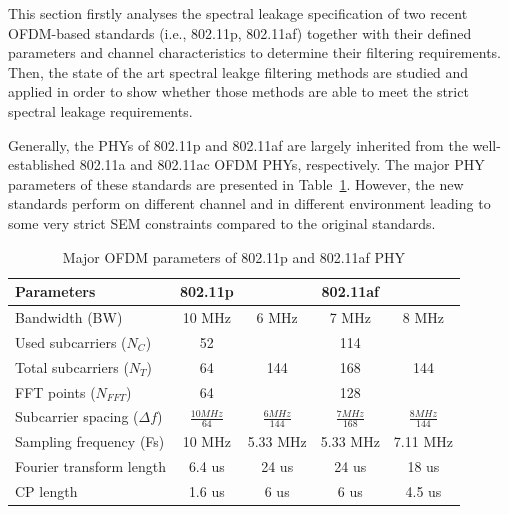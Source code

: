 This section firstly analyses the spectral leakage specification of  two recent OFDM-based standards (i.e., 802.11p, 802.11af) together with their defined parameters and channel characteristics to determine their filtering requirements. Then, the state of the art spectral leakge filtering methods are studied and applied in order to show whether those methods are able to meet the strict spectral leakage requirements.

Generally, the PHYs of 802.11p and 802.11af are largely inherited from the well-established 802.11a and 802.11ac OFDM PHYs, respectively.
The major PHY parameters of these standards are presented in Table~\ref{tab:Para}.
However, the new standards perform on different channel and in different environment leading to some very strict SEM constraints compared to the original standards.

\begin{table}[ht]
	\centering
	\caption{ Major OFDM parameters of 802.11p and 802.11af PHY}
	\renewcommand{\arraystretch}{1.2}
	\label{tab:Para}
	\begin{tabular}{l|c|c|c|c}%
		\hline \hline
		Parameters                      	 		& 802.11p & \multicolumn{3}{c}{802.11af} \\ \hline
		Bandwidth (BW)                  		& 10 MHz  & 6 MHz    & 7 MHz   & 8 MHz   \\ \hline
		Used subcarriers ($N_{C}$) 		& 52      & \multicolumn{3}{c}{114}      \\ \hline
		Total subcarriers ($N_{T}$)  		& 64      & 144      & 168     & 144     \\ \hline
		FFT points ($N_{FFT}$)      		& 64      & \multicolumn{3}{c}{128}      \\ \hline
		Subcarrier spacing ($\Delta f$)        	& $\frac{10 MHz}{64}$   & $\frac{6 MHz}{144}$    & $\frac{7 MHz}{168}$   & $\frac{8 MHz}{144}$   \\[1ex] \hline
		Sampling frequency (Fs)			& 10 MHz & 5.33 MHz & 5.33 MHz & 7.11 MHz  \\ \hline
		Fourier transform length         		& 6.4 us  & 24 us    & 24 us   & 18 us   \\ \hline
		CP length                        			& 1.6 us  & 6 us     & 6 us    & 4.5 us   
	\end{tabular}
\end{table}


